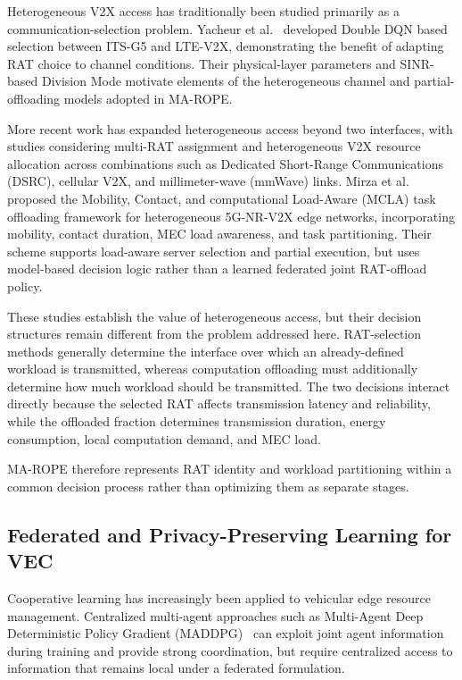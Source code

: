 \documentclass[journal,10pt,twocolumn]{IEEEtran}
\begin{document}
Heterogeneous V2X access has traditionally been studied primarily as a communication-selection problem. Yacheur et al.~\cite{yacheur2023} developed Double DQN based selection between ITS-G5 and LTE-V2X, demonstrating the benefit of adapting RAT choice to channel conditions. Their physical-layer parameters and SINR-based Division Mode motivate elements of the heterogeneous channel and partial-offloading models adopted in MA-ROPE.

More recent work has expanded heterogeneous access beyond two interfaces, with studies considering multi-RAT assignment and heterogeneous V2X resource allocation across combinations such as Dedicated Short-Range Communications (DSRC), cellular V2X, and millimeter-wave (mmWave) links. Mirza et al.~\cite{mirza2023} proposed the Mobility, Contact, and computational Load-Aware (MCLA) task offloading framework for heterogeneous 5G-NR-V2X edge networks, incorporating mobility, contact duration, MEC load awareness, and task partitioning. Their scheme supports load-aware server selection and partial execution, but uses model-based decision logic rather than a learned federated joint RAT-offload policy.

These studies establish the value of heterogeneous access, but their decision structures remain different from the problem addressed here. RAT-selection methods generally determine the interface over which an already-defined workload is transmitted, whereas computation offloading must additionally determine how much workload should be transmitted. The two decisions interact directly because the selected RAT affects transmission latency and reliability, while the offloaded fraction determines transmission duration, energy consumption, local computation demand, and MEC load.

MA-ROPE therefore represents RAT identity and workload partitioning within a common decision process rather than optimizing them as separate stages.

\subsection{Federated and Privacy-Preserving Learning for VEC}

Cooperative learning has increasingly been applied to vehicular edge resource management. Centralized multi-agent approaches such as Multi-Agent Deep Deterministic Policy Gradient (MADDPG)~\cite{lowe2017} can exploit joint agent information during training and provide strong coordination, but require centralized access to information that remains local under a federated formulation.
\end{document}
